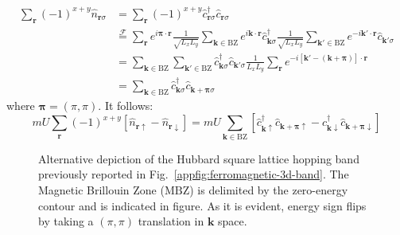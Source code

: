 \begin{align}
	\sum_\mathbf{r} (-1)^{x+y} \hat n_{\mathbf{r}\sigma} &= \sum_\mathbf{r} (-1)^{x+y} \hat c_{\mathbf{r}\sigma}^\dagger \hat c_{\mathbf{r}\sigma} \nonumber \\
	&\stackrel{\mathcal{F}}{=} \sum_\mathbf{r} e^{i \bm{\pi} \cdot \mathbf{r}}
	\frac{1}{\sqrt{L_x L_y}} \sum_{\mathbf{k} \in \mathrm{BZ}} e^{i \mathbf{k} \cdot \mathbf{r}} \hat c_{\mathbf{k}\sigma}^\dagger \frac{1}{\sqrt{L_x L_y}} \sum_{\mathbf{k}' \in \mathrm{BZ}} e^{-i \mathbf{k}' \cdot \mathbf{r}} \hat c_{\mathbf{k}'\sigma} \nonumber \\
	&=\sum_{\mathbf{k} \in \mathrm{BZ}} \sum_{\mathbf{k}' \in \mathrm{BZ}} \hat c_{\mathbf{k}\sigma}^\dagger \hat c_{\mathbf{k}'\sigma} \frac{1}{L_x L_y} \sum_\mathbf{r} e^{-i [\mathbf{k}' - (\mathbf{k} + \bm{\pi}) ] \cdot \mathbf{r}} \nonumber \\
	&= \sum_{\mathbf{k} \in \mathrm{BZ}} \hat c_{\mathbf{k}\sigma}^\dagger \hat c_{\mathbf{k}+\bm{\pi}\sigma}\label{appeq:af-hm-staggered-n-transform}
\end{align}
where $\bm{\pi} = (\pi,\pi)$. It follows:
\[
mU \sum_\mathbf{r} (-1)^{x+y} \left[
		\hat n_{\mathbf{r}\uparrow} - \hat n_{\mathbf{r}\downarrow}
	\right] = mU \sum_{\mathbf{k} \in \mathrm{BZ}} \left[
		\hat c_{\mathbf{k}\uparrow}^\dagger \hat c_{\mathbf{k}+\bm{\pi}\uparrow} - \hat c_{\mathbf{k}\downarrow}^\dagger \hat c_{\mathbf{k}+\bm{\pi}\downarrow}
	\right]
\]

\begin{figure}
	\centering
%		
%		
	\caption{Alternative depiction of the Hubbard square lattice hopping band previously reported in Fig.~\ref{appfig:ferromagnetic-3d-band}. The Magnetic Brillouin Zone ($\mathrm{MBZ}$) is delimited by the zero-energy contour and is indicated in figure. As it is evident, energy sign flips by taking a $(\pi,\pi)$ translation in $\mathbf{k}$ space.}
	\label{appfig:alternative-ferromagnetic-band}
\end{figure}

